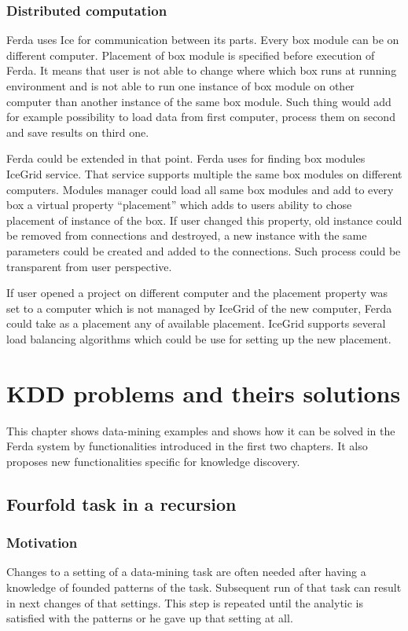 \documentclass[a4paper,12pt]{book}
\begin{document}
\subsection{Distributed computation}
Ferda uses Ice for communication between its parts. Every box module can be on different computer. Placement of box module is specified before execution of Ferda. It means that user is not able to change where which box runs at running environment and is not able to run one instance of box module on other computer than another instance of the same box module. Such thing would add for example possibility to load data from first computer, process them on second and save results on third one. 

Ferda could be extended in that point. Ferda uses for finding box modules IceGrid service. That service supports multiple the same box modules on different computers. Modules manager could load all same box modules and add to every box a virtual property ``placement'' which adds to users ability to chose placement of instance of the box. If user changed this property, old instance could be removed from connections and destroyed, a new instance with the same parameters could be created and added to the connections. Such process could be transparent from user perspective.

If user opened a project on different computer and the placement property was set to a computer which is not managed by IceGrid of the new computer, Ferda could take as a placement any of available placement. IceGrid supports several load balancing algorithms which could be use for setting up the new placement.

\chapter{KDD problems and theirs solutions}
\label{chap:KDDExamples}
This chapter shows data-mining examples and shows how it can be solved in the Ferda system by functionalities introduced in the first two chapters. It also proposes new functionalities specific for knowledge discovery.

\section{Fourfold task in a recursion}
\subsection{Motivation}
Changes to a setting of a data-mining task are often needed after having a knowledge of founded patterns of the task. Subsequent run of that task can result in next changes of that settings. This step is repeated until the analytic is satisfied with the patterns or he gave up that setting at all.
\end{document}
